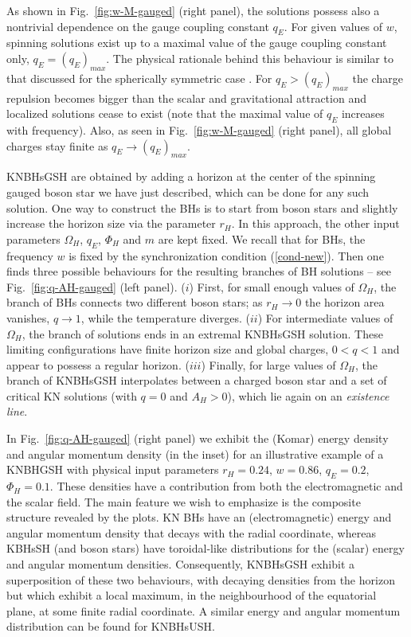 As shown in Fig.~\ref{fig:w-M-gauged} (right panel), 
the solutions possess also a nontrivial dependence on 
the gauge coupling constant $q_E$.
For given values of $w$,
spinning solutions exist up to a maximal
value of the gauge coupling constant only, $q_E=(q_E)_{max}$.
The physical rationale behind this behaviour 
is similar to that discussed for the spherically symmetric case 
\cite{Jetzer:1989av,Pugliese:2013gsa}.
For $q_E>(q_E)_{max}$ the charge repulsion  becomes bigger than
  the scalar and gravitational attraction and localized solutions cease to exist  
(note that the maximal value of $q_E$
increases with frequency).
Also, as seen in Fig.~\ref{fig:w-M-gauged} (right panel),
all global charges stay finite as $q_E\to (q_E)_{max}$.

\bigskip

KNBHsGSH are obtained by adding a horizon at the center of the spinning gauged boson star  
we have just described, which can be done for  any such  solution.
One way to construct the BHs
  is to  start from  boson stars 
and slightly increase the horizon size via the parameter $r_H$.
In this approach, the other input parameters 
$\Omega_H$, $q_E$,  $\Phi_H$ and $m$
are kept fixed. 
We recall that for BHs, the frequency $w$ is fixed by the synchronization condition (\ref{cond-new}).
Then one finds three 
possible behaviours for
the resulting branches of BH solutions -- see Fig.~\ref{fig:q-AH-gauged} (left panel).
($i$) First, for small enough values of $\Omega_H$,
 the branch of BHs connects two different boson stars; 
as $r_H\to 0$ the horizon area vanishes, $q\to 1$, while the temperature
 diverges.
($ii$) For intermediate values of  $\Omega_H$,
the branch of solutions ends in an extremal KNBHsGSH solution. 
These limiting configurations have finite
horizon size   and global charges, $0<q<1$ and appear to possess 
a regular horizon.
($iii$) Finally, for large values of $\Omega_H$,
the branch of  KNBHsGSH interpolates between 
a charged boson star and a set of critical KN solutions (with $q=0$ and $A_H>0$), which lie again 
on an {\it existence line}. 

 In Fig.~\ref{fig:q-AH-gauged} (right panel) we exhibit the (Komar) energy density and angular momentum density (in the inset) for an illustrative example of a KNBHGSH  with physical input parameters 
$r_H=0.24$, $w =0.86$, $q_E =0.2$, $\Phi_H=0.1$. 
These densities have a contribution from both the electromagnetic and the scalar field. The main feature we wish to emphasize is the composite structure revealed by the plots. KN BHs have an (electromagnetic) energy and angular momentum density that decays with the radial coordinate, whereas KBHsSH 
(and boson stars)
have toroidal-like distributions for the (scalar) energy and angular momentum densities. 
Consequently, KNBHsGSH exhibit a superposition of these two behaviours, with decaying densities from the horizon but which exhibit a local maximum, in the neighbourhood of the equatorial plane, at some finite radial coordinate. 
A similar energy and angular momentum distribution can be found for KNBHsUSH.  

